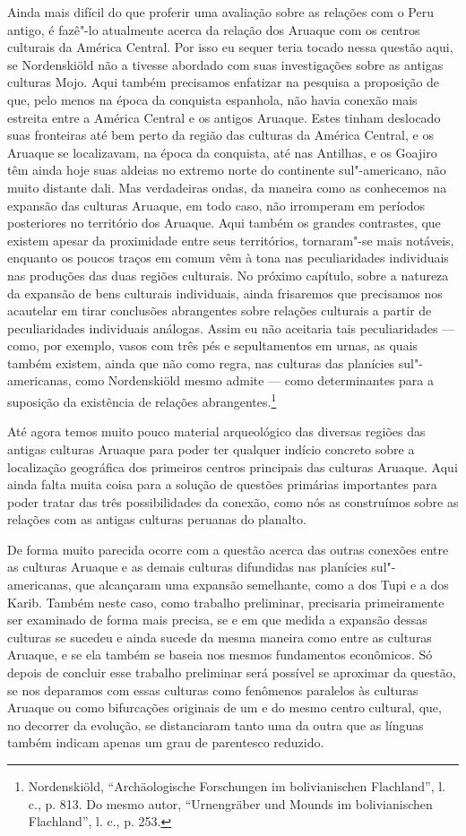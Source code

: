 Ainda mais difícil do que proferir uma avaliação sobre as relações com o
Peru antigo, é fazê"-lo atualmente acerca da relação dos Aruaque com os
centros culturais da América Central. Por isso eu sequer teria tocado
nessa questão aqui, se Nordenskiöld não a tivesse abordado com suas
investigações sobre as antigas culturas Mojo. Aqui também precisamos
enfatizar na pesquisa a proposição de que, pelo menos na época da
conquista espanhola, não havia conexão mais estreita entre a América
Central e os antigos Aruaque. Estes tinham deslocado suas fronteiras até
bem perto da região das culturas da América Central, e os Aruaque se
localizavam, na época da conquista, até nas Antilhas, e os Goajiro têm
ainda hoje suas aldeias no extremo norte do continente sul"-americano,
não muito distante dali. Mas verdadeiras ondas, da maneira como as
conhecemos na expansão das culturas Aruaque, em todo caso, não
irromperam em períodos posteriores no território dos Aruaque. Aqui
também os grandes contrastes, que existem apesar da proximidade entre
seus territórios, tornaram"-se mais notáveis, enquanto os poucos traços
em comum vêm à tona nas peculiaridades individuais nas produções das
duas regiões culturais. No próximo capítulo, sobre a natureza da
expansão de bens culturais individuais, ainda frisaremos que precisamos
nos acautelar em tirar conclusões abrangentes sobre relações culturais a
partir de peculiaridades individuais análogas. Assim eu não aceitaria
tais peculiaridades --- como, por exemplo, vasos com três pés e
sepultamentos em urnas, as quais também existem, ainda que não como
regra, nas culturas das planícies sul"-americanas, como Nordenskiöld
mesmo admite --- como determinantes para a suposição da existência de
relações abrangentes.\footnote{Nordenskiöld, ``Archäologische Forschungen
  im bolivianischen Flachland'', l. c., p. 813. Do mesmo autor,
  ``Urnengräber und Mounds im bolivianischen Flachland'', l. c., p.
  253.}

Até agora temos muito pouco material arqueológico das diversas regiões
das antigas culturas Aruaque para poder ter qualquer indício concreto
sobre a localização geográfica dos primeiros centros principais das
culturas Aruaque. Aqui ainda falta muita coisa para a solução de
questões primárias importantes para poder tratar das três
possibilidades da conexão, como nós as construímos sobre as relações com
as antigas culturas peruanas do planalto.

De forma muito parecida ocorre com a questão acerca das outras conexões
entre as culturas Aruaque e as demais culturas difundidas nas planícies
sul"-americanas, que alcançaram uma expansão semelhante, como a dos Tupi
e a dos Karib. Também neste caso, como trabalho preliminar, precisaria
primeiramente ser examinado de forma mais precisa, se e em que medida a
expansão dessas culturas se sucedeu e ainda sucede da mesma maneira
como entre as culturas Aruaque, e se ela também se baseia nos mesmos
fundamentos econômicos. Só depois de concluir esse trabalho preliminar
será possível se aproximar da questão, se nos deparamos com essas
culturas como fenômenos paralelos às culturas Aruaque ou como
bifurcações originais de um e do mesmo centro cultural, que, no decorrer
da evolução, se distanciaram tanto uma da outra que as línguas também
indicam apenas um grau de parentesco reduzido.

